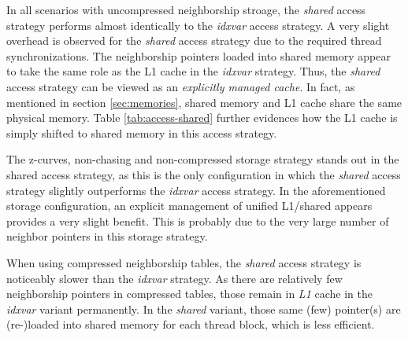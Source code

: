 In all scenarios with uncompressed neighborship stroage, the \emph{shared} access strategy performs almost identically to the \emph{idxvar} access strategy. A very slight overhead is observed for the \emph{shared} access strategy due to the required thread synchronizations. The neighborship pointers loaded into shared memory appear to take the same role as the L1 cache in the \emph{idxvar} strategy. Thus, the \emph{shared} access strategy can be viewed as an \emph{explicitly managed cache}. In fact, as mentioned in section \ref{sec:memories}, shared memory and L1 cache share the same physical memory. Table \ref{tab:access-shared} further evidences how the L1 cache is simply shifted to shared memory in this access strategy.

The z-curves, non-chasing and non-compressed storage strategy stands out in the shared access strategy, as this is the only configuration in which the \emph{shared} access strategy slightly outperforms the \emph{idxvar} access strategy. In the aforementioned storage configuration, an explicit management of unified L1/shared appears provides a very slight benefit. This is probably due to the very large number of neighbor pointers in this storage strategy.

When using compressed neighborship tables, the \emph{shared} access strategy is noticeably slower than the \emph{idxvar} strategy. As there are relatively few neighborship pointers in compressed tables, those remain in \emph{L1} cache in the \emph{idxvar} variant permanently. In the \emph{shared} variant, those same (few) pointer(s) are (re-)loaded into shared memory for each thread block, which is less efficient.

